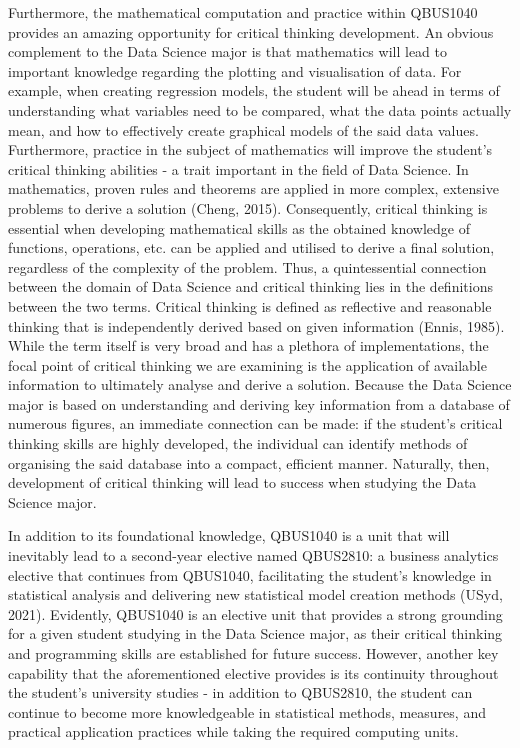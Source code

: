\documentclass[11pt, a4paper]{report}
\begin{document}
Furthermore, the mathematical computation and practice within QBUS1040 provides an amazing opportunity for critical thinking development. An obvious complement to the Data Science major is that mathematics will lead to important knowledge regarding the plotting and visualisation of data. For example, when creating regression models, the student will be ahead in terms of understanding what variables need to be compared, what the data points actually mean, and how to effectively create graphical models of the said data values. Furthermore, practice in the subject of mathematics will improve the student’s critical thinking abilities - a trait important in the field of Data Science. In mathematics, proven rules and theorems are applied in more complex, extensive problems to derive a solution (Cheng, 2015). Consequently, critical thinking is essential when developing mathematical skills as the obtained knowledge of functions, operations, etc. can be applied and utilised to derive a final solution, regardless of the complexity of the problem. Thus, a quintessential connection between the domain of Data Science and critical thinking lies in the definitions between the two terms. Critical thinking is defined as reflective and reasonable thinking that is independently derived based on given information (Ennis, 1985). While the term itself is very broad and has a plethora of implementations, the focal point of critical thinking we are examining is the application of available information to ultimately analyse and derive a solution. Because the Data Science major is based on understanding and deriving key information from a database of numerous figures, an immediate connection can be made: if the student’s critical thinking skills are highly developed, the individual can identify methods of organising the said database into a compact, efficient manner. Naturally, then, development of critical thinking will lead to success when studying the Data Science major.


In addition to its foundational knowledge, QBUS1040 is a unit that will inevitably lead to a second-year elective named QBUS2810: a business analytics elective that continues from QBUS1040, facilitating the student’s knowledge in statistical analysis and delivering new statistical model creation methods (USyd, 2021). Evidently, QBUS1040 is an elective unit that provides a strong grounding for a given student studying in the Data Science major, as their critical thinking and programming skills are established for future success. However, another key capability that the aforementioned elective provides is its continuity throughout the student’s university studies - in addition to QBUS2810, the student can continue to become more knowledgeable in statistical methods, measures, and practical application practices while taking the required computing units. 
\end{document}
